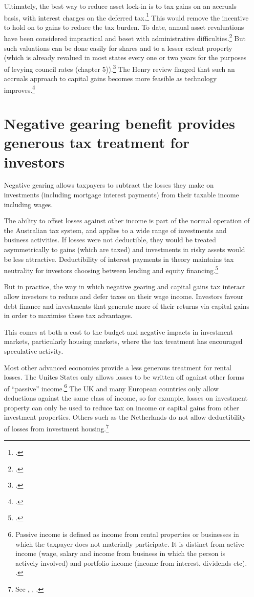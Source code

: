 \documentclass{grattan}\usepackage[]{graphicx}\usepackage[]{color}
\begin{document}
Ultimately, the best way to reduce asset lock-in is to tax gains on an accruals basis, with interest charges on the deferred tax.\footcite[pp.~11-14]{Burman2009} This would remove the incentive to hold on to gains to reduce the tax burden. To date, annual asset revaluations have been considered impractical and beset with administrative difficulties.\footcites{OECD2006a}{Commission2004} But such valuations can be done easily for shares and to a lesser extent property (which is already revalued in most states every one or two years for the purposes of levying council rates (chapter 5)).\footcites{Burman2009}[p.~12]{Ingles2009} The Henry review flagged that such an accruals approach to capital gains becomes more feasible as technology improves.\footcite[p.~64]{Treasury2010} 


\section{Negative gearing benefit provides generous tax treatment for investors}\label{sec:negative_gearing_provides}
Negative gearing allows taxpayers to subtract the losses they make on investments (including mortgage interest payments) from their taxable income including wages. 

The ability to offset losses against other income is part of the normal operation of the Australian tax system, and applies to a wide range of investments and business activities. If losses were not deductible, they would be treated asymmetrically to gains (which are taxed) and investments in risky assets would be less attractive. Deductibility of interest payments in theory maintains tax neutrality for investors choosing between lending and equity financing.\footcite{Fane2004}  

But in practice, the way in which negative gearing and capital gains tax interact allow investors to reduce and defer taxes on their wage income. Investors favour debt finance and investments that generate more of their returns via capital gains in order to maximise these tax advantages. 

This comes at both a cost to the budget and negative impacts in investment markets, particularly housing markets, where the tax treatment has encouraged speculative activity. 

Most other advanced economies provide a less generous treatment for rental losses. The Unites States only allows losses to be written off against other forms of ``passive'' income.\footnote{Passive income is defined as income from rental properties or businesses in which the taxpayer does not materially participate. It is distinct from active income (wage, salary and income from business in which the person is actively involved) and portfolio income (income from interest, dividends etc). \textcite{IRS2015}.}  The UK and many European countries only allow deductions against the same class of income, so for example, losses on investment property can only be used to reduce tax on income or capital gains from other investment properties. Others such as the Netherlands do not allow deductibility of losses from investment housing.\footnote{See \textcite[p.~43]{RBA2014}, \textcite[p.~86]{Commission2004}, \textcite[pp.~92-95]{ODonnell2005}.}
\end{document}
